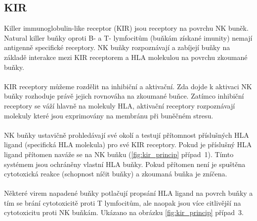 \documentclass[czech,DP]{thesiskiv}
\begin{document}
\subsection{KIR}
Killer immunoglobulin-like receptor (KIR) jsou receptory na povrchu NK buněk. Natural killer buňky oproti B- a T- lymfocitům (buňkám získané imunity) nemají antigenně specifické receptory. NK buňky rozpoznávají a zabíjejí buňky na základě interakce mezi KIR receptorem a HLA molekulou na povrchu zkoumané buňky. 
\\
\\
KIR receptory můžeme rozdělit na inhibiční a aktivační. Zda dojde k aktivaci NK buňky rozhoduje právě jejich rovnováha na zkoumané buňce. Zatímco inhibiční receptory se váží hlavně na molekuly HLA, aktivační receptory rozpoznávají molekuly které jsou exprimovány na membránu při buněčném stresu.
\\
\\
NK buňky ustavičně prohledávají své okolí a testují přítomnost příslušných HLA ligand (specifická HLA molekula) pro své KIR receptory. Pokud je příslušný HLA ligand přítomen naváže se na NK buňku (\ref{fig:kir_princip} případ~1). Tímto systémem jsou ochráněny vlastní HLA buňky. Pokud přítomen není je spuštěna cytotoxická reakce (schopnost níčit buňky) a zkoumaná buňka je zníčena.
\\
\\
Některé virem napadené buňky potlačují propsání HLA ligand na povrch buňky a tím se brání cytotoxicitě proti T lymfocitům, ale naopak jsou více citlivější na cytotoxicitu proti NK buňkám. Ukázano na obrázku \ref{fig:kir_princip} případ~3.
\end{document}
